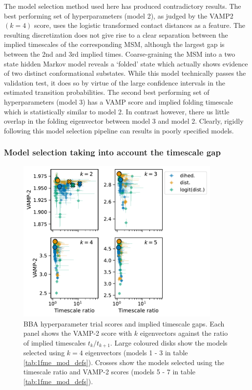 \documentclass[journal=jacsat,manuscript=article]{achemso}
\begin{document}
The model selection method used here has produced contradictory results.  The best performing set of hyperparameters (model 2), as judged by the VAMP2$(k=4)$ score, uses the logistic transformed contact distances as a feature.  The resulting discretization  does not give rise to a clear separation between the implied timescales of the corresponding MSM, although the largest gap is between the 2nd and 3rd implied times. Coarse-graining the MSM into a two state hidden Markov model reveals a  `folded' state which actually shows evidence of two distinct conformational substates. While this model technically passes the validation test, it does so by virtue of the large confidence intervals in the estimated transition probabilities.  The second best performing set of hyperparameters (model 3) has a VAMP score and implied folding timescale which is statistically similar to model 2.  In contrast however, there us little overlap in the folding eigenvector between model 3 and model 2.  Clearly, rigidly following this model selection pipeline can results in poorly specified models. 

\subsubsection{Model selection taking into account the timescale gap}

\begin{figure}
    \centering
    \includegraphics[width=0.9\textwidth]{figures/vamp_scores/BBA_vamp_vs_gap.pdf}
    \caption{BBA hyperparameter trial scores and implied timescale gaps.  Each panel shows the VAMP-2 score with $k$ eigenvectors against the ratio of implied timescales $t_{k}/t_{k+1}$. Large coloured disks show the models selected using $k=4$ eigenvectors (models 1 - 3 in table \ref{tab:1fme_mod_defs}).  Crosses show the models selected using the timescale ratio and VAMP-2 scores (models 5 - 7 in table \ref{tab:1fme_mod_defs}).}
    \label{fig:bba_vamp_var_k}
\end{figure}
\end{document}
